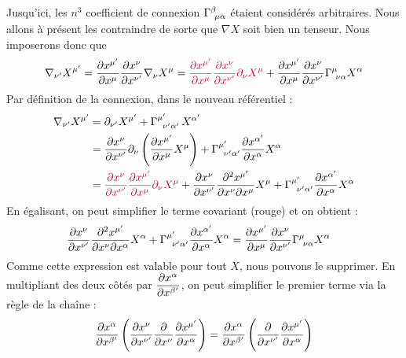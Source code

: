 Jusqu'ici, les $n^3$ coefficient de connexion $\Gamma\indices{^{\beta}_{\!\mu \alpha}}$ étaient considérés arbitraires. Nous allons à présent les contraindre de sorte que $\nabla X$ soit bien un tenseur. Nous imposerons donc que
\begin{align}
    \nabla_{\nu '}X^{\mu '} = \frac{\partial x^{\mu'}}{\partial x^{\mu}}\frac{\partial x^{\nu}}{\partial x^{\nu '}}\nabla_{\nu }X^{\mu }= \textcolor{purple}{\frac{\partial x^{\mu'}}{\partial x^{\mu}}\frac{\partial x^{\nu}}{\partial x^{\nu '}}\partial_{\nu}X^{\mu}} + \frac{\partial x^{\mu'}}{\partial x^{\mu}}\frac{\partial x^{\nu}}{\partial x^{\nu '}}\Gamma\indices{^{\mu }_{\!\nu \alpha}}X^{\alpha }
\end{align}
Par définition de la connexion, dans le nouveau référentiel :
\begin{align}
    \nabla_{\nu '}X^{\mu '} &= \pd_{\nu'} X^{\mu'} + \Gamma\indices{^{\mu'}_{\!\!\nu'\alpha'}}\, X^{\alpha'}\\
    &=\frac{\partial x^{\nu}}{\partial x^{\nu '}}\partial_{\nu}\left(\frac{\partial x^{\mu'}}{\partial x^{\mu}} X^{\mu}\right) + \Gamma\indices{^{\mu '}_{\!\!\nu '\alpha '}}\frac{\partial x^{\alpha '}}{\partial x^{\alpha }} X^{\alpha}\\
    &= \textcolor{purple}{\frac{\partial x^{\nu}}{\partial x^{\nu '}}\frac{\partial x^{\mu'}}{\partial x^{\mu}}\partial_{\nu}X^{\mu}} +\frac{\partial x^{\nu}}{\partial x^{\nu '}}\frac{\partial^2 x^{\mu'}}{\partial x^{\nu} \partial x^{\mu}}X^{\mu}  + \Gamma\indices{^{\mu '}_{\!\!\nu '\alpha '}}\frac{\partial x^{\alpha '}}{\partial x^{\alpha }} X^{\alpha}
\end{align}
En égalisant, on peut simplifier le terme covariant (rouge) et on obtient :
\begin{align}
\label{eq: Connexion tenseur1}
    &\frac{\partial x^{\nu}}{\partial x^{\nu '}}\frac{\partial^2 x^{\mu'}}{\partial x^{\nu} \partial x^{\alpha}}X^{\alpha} + \Gamma\indices{^{\mu '}_{\!\!\nu '\alpha '}}\frac{\partial x^{\alpha '}}{\partial x^{\alpha }} X^{\alpha} = \frac{\partial x^{\mu'}}{\partial x^{\mu}}\frac{\partial x^{\nu}}{\partial x^{\nu '}}\Gamma\indices{^{\mu }_{\!\nu \alpha}}X^{\alpha }
\end{align}
Comme cette expression est valable pour tout $X$, nous pouvons le supprimer. En multipliant des deux côtés par $\dfrac{\partial x^\alpha}{\partial x^{\beta'}}$, on peut simplifier le premier terme via la règle de la chaîne :
\begin{align}
    \frac{\partial x^{\alpha}}{\partial x^{\beta '}}  \left( \frac{\partial x^{\nu}}{\partial x^{\nu '}} \frac{\partial}{\partial x^\nu} \frac{\partial x^{\mu'}}{ \partial x^{\alpha}} \right) = \frac{\partial x^{\alpha}}{\partial x^{\beta '}}  \left( \frac{\partial}{\partial x^{\nu'}} \frac{\partial x^{\mu'}}{ \partial x^{\alpha}}\right) 
\end{align}

